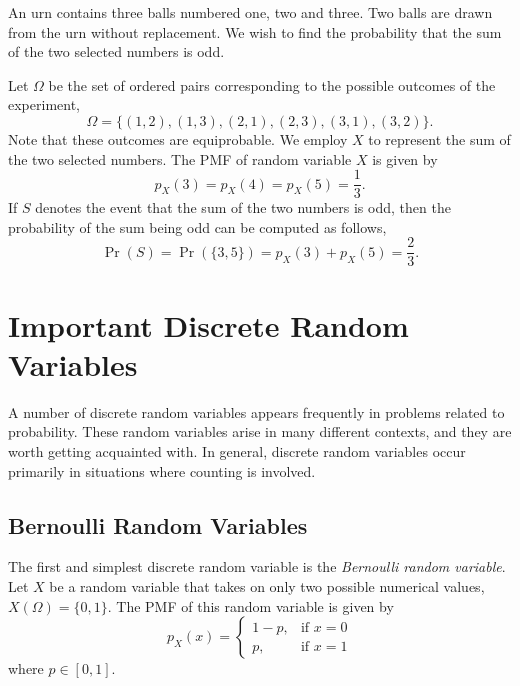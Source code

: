 \begin{example}
An urn contains three balls numbered one, two and three.
Two balls are drawn from the urn without replacement.
We wish to find the probability that the sum of the two selected numbers is odd.

Let $\Omega$ be the set of ordered pairs corresponding to the possible outcomes of the experiment,
\begin{equation*}
\Omega = \{ (1, 2), (1, 3), (2, 1), (2, 3), (3, 1), (3, 2) \}.
\end{equation*}
Note that these outcomes are equiprobable.
We employ $X$ to represent the sum of the two selected numbers.
The PMF of random variable $X$ is given by
\begin{equation*}
p_X (3) = p_X (4) = p_X (5) = \frac{1}{3}.
\end{equation*}
If $S$ denotes the event that the sum of the two numbers is odd, then the probability of the sum being odd can be computed as follows,
\begin{equation*}
\Pr (S) = \Pr ( \{ 3, 5 \} )
= p_X (3) + p_X (5) = \frac{2}{3} .
\end{equation*}
\end{example}


\section{Important Discrete Random Variables}

A number of discrete random variables appears frequently in problems related to probability.
These random variables arise in many different contexts, and they are worth getting acquainted with.
In general, discrete random variables occur primarily in situations where counting is involved.


\subsection{Bernoulli Random Variables}

The first and simplest discrete random variable is the \emph{Bernoulli random variable}. 
Let $X$ be a random variable that takes on only two possible numerical values, $X(\Omega) = \{0, 1\}$.
The PMF of this random variable is given by
\begin{equation*}
p_X (x) = \left\{ \begin{array}{ll}
1 - p, & \text{if }x = 0 \\
p, & \text{if }x = 1
\end{array} \right.
\end{equation*}
where $p \in [0, 1]$.

